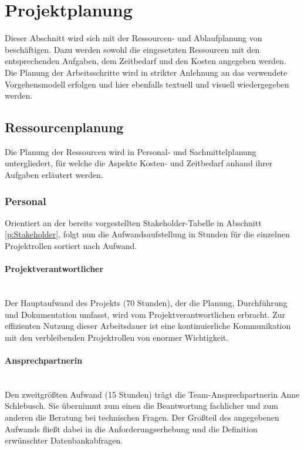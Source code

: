 \section{Projektplanung} 
\label{sec:Projektplanung}
Dieser Abschnitt wird sich mit der Ressourcen- und Ablaufplanung von \projektName beschäftigen. Dazu werden sowohl die eingesetzten Ressourcen mit den entsprechenden Aufgaben, dem Zeitbedarf und den Kosten angegeben werden. Die Planung der Arbeitsschritte wird in strikter Anlehnung an das verwendete Vorgehensmodell erfolgen und hier ebenfalls textuell und visuell wiedergegeben werden.

\subsection{Ressourcenplanung}
\label{sec:Ressourcenplanung}
Die Planung der Ressourcen wird in Personal- und Sachmittelplanung untergliedert, für welche die Aspekte Kosten- und Zeitbedarf anhand ihrer Aufgaben erläutert werden.

\subsubsection{Personal}
\label{sec:Personal}
Orientiert an der bereits vorgestellten Stakeholder-Tabelle in Abschnitt \ref{p:Stakeholder}, folgt nun die Aufwandsaufstellung in Stunden für die einzelnen Projektrollen sortiert nach Aufwand.

\paragraph{Projektverantwortlicher} ~\\
\label{p:Projektverantwortlicher}
Der Hauptaufwand des Projekts (70 Stunden), der \ua die Planung, Durchführung und Dokumentation umfasst, wird vom Projektverantwortlichen \autorName\xspace erbracht. Zur effizienten Nutzung dieser Arbeitsdauer ist eine kontinuierliche Kommunikation mit den verbleibenden Projektrollen von enormer Wichtigkeit.

\paragraph{Ansprechpartnerin} ~\\
\label{p:Ansprechpartnerin}
Den zweitgrößten Aufwand (15 Stunden) trägt die Team-Ansprechpartnerin Anne Schlebusch. Sie übernimmt zum einen die Beantwortung fachlicher und zum anderen die Beratung bei technischen Fragen. Der Großteil des angegebenen Aufwands fließt dabei in die Anforderungserhebung und die Definition erwünschter Datenbankabfragen.

